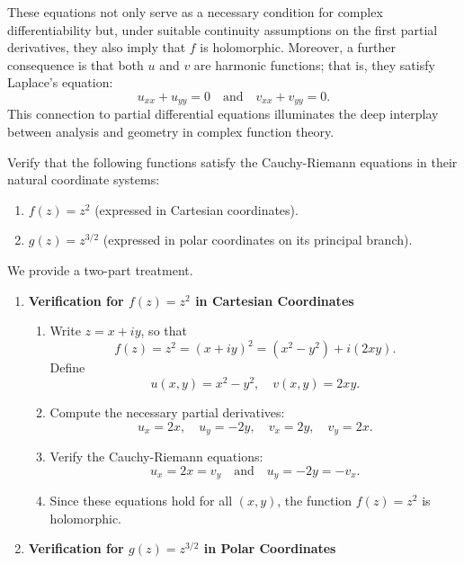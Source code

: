 \noindent These equations not only serve as a necessary condition for complex differentiability but, under suitable continuity assumptions on the first partial derivatives, they also imply that \(f\) is holomorphic. Moreover, a further consequence is that both \(u\) and \(v\) are harmonic functions; that is, they satisfy Laplace's equation:
\[
u_{xx}+u_{yy}=0 \quad \text{and} \quad v_{xx}+v_{yy}=0.
\]
This connection to partial differential equations illuminates the deep interplay between analysis and geometry in complex function theory.

\exampleline
\begin{example}
Verify that the following functions satisfy the Cauchy-Riemann equations in their natural coordinate systems:
\begin{enumerate}
    \item \( f(z) = z^2 \) (expressed in Cartesian coordinates).
    \item \( g(z) = z^{3/2} \) (expressed in polar coordinates on its principal branch).
\end{enumerate}

\begin{solution}
We provide a two-part treatment.

\begin{enumerate}

\item \textbf{Verification for \( f(z)=z^2 \) in Cartesian Coordinates}

\begin{enumerate}
  \item Write \( z=x+iy \), so that
  \[
  f(z)=z^2=(x+iy)^2=(x^2-y^2)+i(2xy).
  \]
  Define
  \[
  u(x,y)=x^2-y^2,\quad v(x,y)=2xy.
  \]
  
  \item Compute the necessary partial derivatives:
  \[
  u_x=2x,\quad u_y=-2y,\quad v_x=2y,\quad v_y=2x.
  \]
  
  \item Verify the Cauchy-Riemann equations:
  \[
  u_x=2x=v_y\quad \text{and}\quad u_y=-2y=-v_x.
  \]
  
  \item Since these equations hold for all \((x,y)\), the function \( f(z)=z^2 \) is holomorphic.
\end{enumerate}

\bigskip

\item \textbf{Verification for \( g(z)=z^{3/2} \) in Polar Coordinates}


\end{enumerate}
\end{solution}
\end{example}
